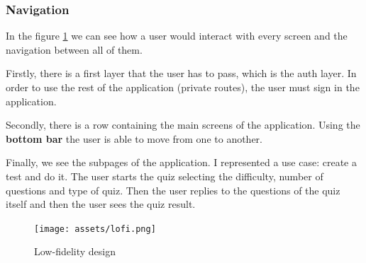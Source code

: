 \subsubsection{Navigation}
In the figure \ref{fig:design_lofi} we can see how a user would interact with every screen and the navigation between all of them.

Firstly, there is a first layer that the user has to pass, which is the auth layer. In order to use the rest of the application (private routes), the user
must sign in the application.

Secondly, there is a row containing the main screens of the application. Using the \textbf{bottom bar} the user is able to move from one to another.

Finally, we see the subpages of the application.
I represented a use case: create a test and do it. The user starts the quiz selecting the difficulty, number of questions and type of quiz. Then the user replies to the questions of the quiz itself and then the user sees the quiz result.

\begin{figure}[H]
    \centering
        \texttt{[image: assets/lofi.png]}
    \caption{Low-fidelity design}
    \label{fig:design_lofi}
\end{figure}

